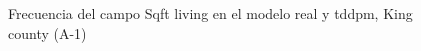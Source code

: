 \begin{figure}[H]
    \centering
    
    \caption{Frecuencia del campo Sqft living en el modelo real y tddpm, King county (A-1)}
    \label{frecuency-tddpm-sqft living}
\end{figure}